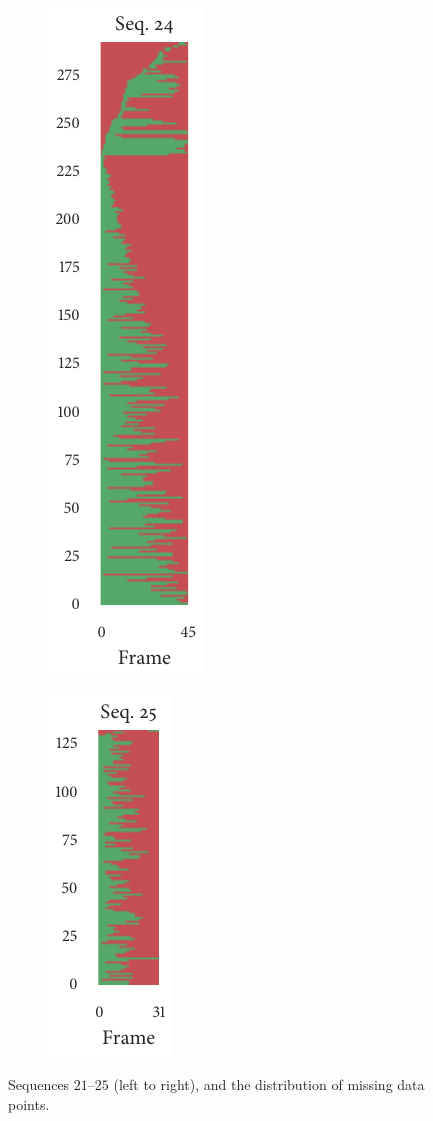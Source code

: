 \begin{figure}[b]
\begin{subfigure}[b]{0.2\textwidth}
		\includegraphics{missingness_sequence24.pdf}
	\end{subfigure}%
	\begin{subfigure}[b]{0.2\textwidth}
		\centering
		\includegraphics{missingness_sequence25.pdf}
	\end{subfigure}%
	\caption{Sequences $21$--$25$ (left to right), and the distribution of missing data points.}
\end{figure}

